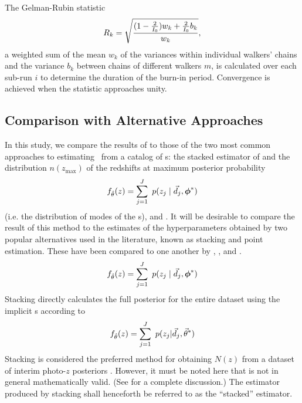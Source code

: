 The Gelman-Rubin statistic
\begin{equation}
\eqlabel{eq:gr}
R_{k} = \sqrt{\frac{(1-\frac{2}{I_{0}})w_{k}+\frac{2}{I_{0}}b_{k}}{w_{k}}},
\end{equation}
a weighted sum of the mean $w_{k}$ of the variances within individual walkers' chains and the variance $b_{k}$ between chains of different walkers $m$, is calculated over each sub-run $i$ to determine the duration of the burn-in period.  
Convergence is achieved when the statistic approaches unity.  

\subsection{Comparison with Alternative Approaches}

In this study, we compare the results of  to those of the two most common approaches to estimating \nz\ from a catalog of \pzpdf s: the stacked estimator of  and the distribution $n(z_{\mathrm{max}})$ of the redshifts at maximum posterior probability
\begin{equation}
\eqlabel{eq:mmap}
f_{\hat{\theta}}(z) = \sum_{j=1}^{J}\ p(z_{j} \gvn \data_{j},\ndphi^{*})
\end{equation}
 (i.e. the distribution of modes of the \pzpdf s), and .
It will be desirable to compare the result of this method to the estimates of the hyperparameters obtained by two popular alternatives used in the literature, known as stacking and point estimation.   
These have been compared 
to one another by \citet{Hildebrandt2012}, \citet{Benjamin2013}, and \citet{Asorey2016}.
\begin{equation}
\eqlabel{eq:stack}
f_{\hat{\theta}}(z) = \sum_{j=1}^{J}\ p(z_{j} \gvn \data_{j},\ndphi^{*})
\end{equation}
Stacking directly calculates the full posterior for the entire dataset using the implicit \pzpdf s according to 
\begin{equation}
\eqlabel{eq:stack}
f_{\hat{\theta}}(z) = \sum_{j=1}^{J}\ p(z_{j}|\vec{d}_{j},\vec{\theta}^{*})
\end{equation}  
Stacking is considered the preferred method for obtaining $N(z)$ from a dataset of interim photo-$z$ posteriors \citep{Sheldon2012, Kelly2014, Benjamin2013, Bonnett2015a, Viironen2015, Asorey2016}.  
However, it must be noted here that  is not in general mathematically valid.  
(See \citet{Hogg2012} for a complete discussion.)  
The estimator produced by stacking shall henceforth be referred to as the ``stacked'' estimator.

